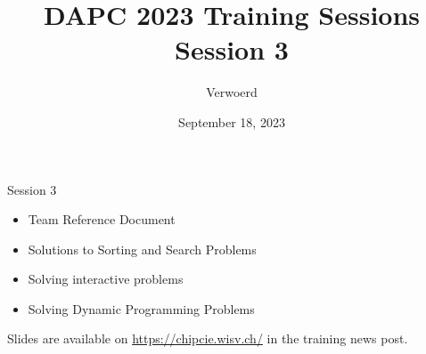 \documentclass[11pt,pdf, aspectratio=169]{beamer}
\title{DAPC 2023 Training Sessions\\Session 3}
\author{Verwoerd}
\date{September 18, 2023}
\begin{document}
  \maketitle
  \begin{frame}{Session 3}
    \begin{itemize}
      \item Team Reference Document
      \item Solutions to Sorting and Search Problems
      \item Solving interactive problems
      \item Solving Dynamic Programming Problems
    \end{itemize}
    Slides are available on \url{https://chipcie.wisv.ch/} in the training news post.
    \doclicenseThis
  \end{frame}
\end{document}
